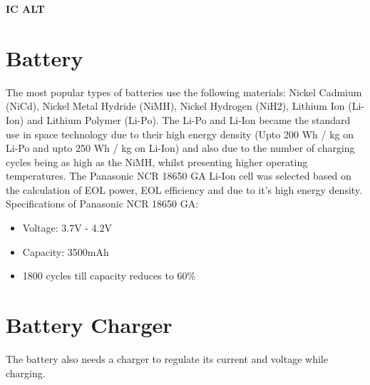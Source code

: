 {\Huge \bf IC ALT}
\section[Battery]{Battery}
The most popular types of batteries use the following materials: Nickel Cadmium
(NiCd), Nickel Metal Hydride (NiMH), Nickel Hydrogen (NiH2), Lithium Ion
(Li-Ion) and Lithium Polymer (Li-Po). The Li-Po and Li-Ion became the standard use in space technology due to their
high energy density (Upto 200 Wh / kg on Li-Po and upto 250 Wh / kg on Li-Ion) and also due to
the number of charging cycles being as high as the NiMH, whilst presenting higher
operating temperatures. 
The Panasonic NCR 18650 GA Li-Ion cell was selected based on the calculation of EOL power, EOL efficiency and due to it's high energy density.
Specifications of Panasonic NCR 18650 GA:
\begin{itemize}
	\item Voltage: 3.7V - 4.2V
	\item Capacity: 3500mAh
	\item 1800 cycles till capacity reduces to 60\%
\end{itemize}
\section[Battery Charger]{Battery Charger}
 The battery also needs a charger to regulate its current and voltage while charging.